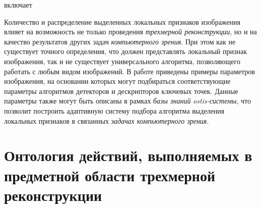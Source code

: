 \begin{SCn}
\begin{scnrelfromset}{включает}
\begin{scnindent}
\begin{scnindent}
                \begin{scnindent}
                \end{scnindent}
                \begin{scnindent}
                \end{scnindent}
            \end{scnindent}
            \begin{scnindent}
            \end{scnindent}
        \end{scnindent}
    \end{scnrelfromset}
\end{SCn}

Количество и распределение выделенных локальных признаков изображения влияет на возможность не только проведения \textit{трехмерной реконструкции}, но и на качество результатов других задач \textit{компьютерного зрения}. При этом как не существует точного определения, что должен представлять локальный признак изображения, так и не существует универсального алгоритма, позволяющего работать с любым видом изображений. В работе  приведены примеры параметров изображения, на основании которых могут подбираться соответствующие параметры алгоритмов детекторов и дескрипторов ключевых точек. Данные параметры также могут быть описаны в рамках \textit{базы знаний} \textit{ostis-системы}, что позволит построить адаптивную систему подбора алгоритма выделения локальных признаков в связанных \textit{задачах компьютерного зрения}.

\section{Онтология действий, выполняемых в предметной области трехмерной реконструкции}
\label{sec_3d_models_actions}

